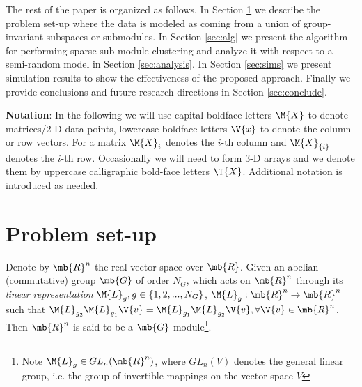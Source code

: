 \documentclass[conference]{IEEEtran}
\begin{document}
The rest of the paper is organized as follows. In Section \ref{sec:prob_setup} we describe the problem set-up where the data is modeled as coming from a union of group-invariant subspaces or submodules. In Section \ref{sec:alg} we present the algorithm for performing sparse sub-module clustering and analyze it with respect to a semi-random model in Section \ref{sec:analysis}. In Section \ref{sec:sims} we present simulation results to show the effectiveness of the proposed approach. Finally we provide conclusions and future research directions in Section \ref{sec:conclude}.

\textbf{Notation}: In the following we will use capital boldface letters $\M{X}$ to denote matrices/2-D data points, lowercase boldface letters $\V{x}$ to denote the column or row vectors. For a matrix $\M{X}_i$ denotes the $i$-th column and $\M{X}_{\{i\}}$ denotes the $i$-th row. Occasionally we will need to form 3-D arrays and we denote them by uppercase calligraphic bold-face letters $\T{X}$. Additional notation is introduced as needed.



\section{Problem set-up}
\label{sec:prob_setup}

Denote by $\mb{R}^n$ the real vector space over $\mb{R}$. Given an abelian (commutative) group $\mb{G}$ of order $N_G$, which acts on $\mb{R}^n$ through its \emph{linear representation} \cite{Serre_book} $\M{L}_g, g \in \{1,2,...,N_G\}$, $\M{L}_g: \mb{R}^n \rightarrow \mb{R}^n$ such that $\M{L}_{g_2}\M{L}_{g_1}\V{v} = \M{L}_{g_1}\M{L}_{g_2}\V{v}, \forall \V{v} \in \mb{R}^n$. Then $\mb{R}^n$ is said to be a $\mb{G}$-module\footnote{Note $\M{L}_g \in GL_n(\mb{R}^{n})$, where $GL_n(V)$ denotes the general linear group, i.e. the group of invertible mappings on the vector space $V$}.

\end{document}
